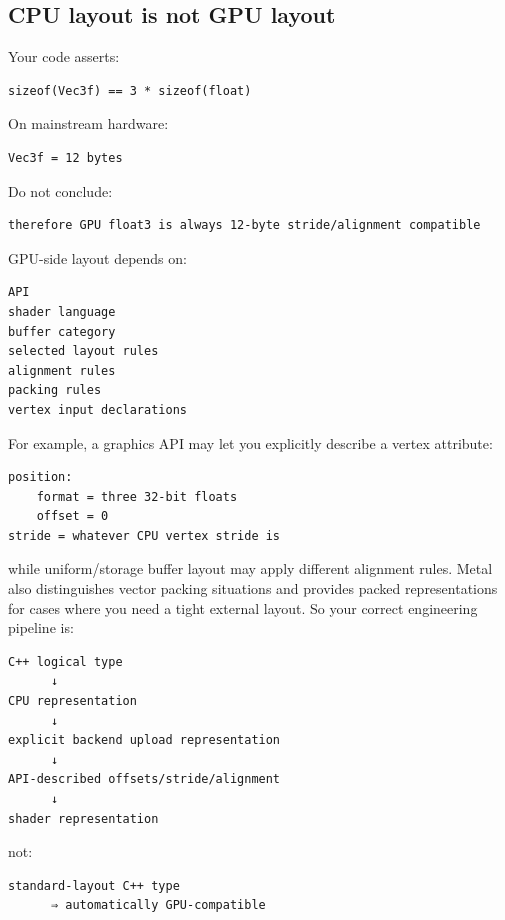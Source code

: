 \subsection{CPU layout is not GPU layout}\label{05-engine-i-ch003-cpu-layout-is-not-gpu-layout}

\hypertarget{05-engine-i-ch003-cpu-layout-is-not-gpu-layout}{}

Your code asserts:

\begin{verbatim}
sizeof(Vec3f) == 3 * sizeof(float)
\end{verbatim}

On mainstream hardware:

\begin{verbatim}
Vec3f = 12 bytes
\end{verbatim}

Do not conclude:

\begin{verbatim}
therefore GPU float3 is always 12-byte stride/alignment compatible
\end{verbatim}

GPU-side layout depends on:

\begin{verbatim}
API
shader language
buffer category
selected layout rules
alignment rules
packing rules
vertex input declarations
\end{verbatim}

For example, a graphics API may let you explicitly describe a vertex attribute:

\begin{verbatim}
position:
    format = three 32-bit floats
    offset = 0
stride = whatever CPU vertex stride is
\end{verbatim}

while uniform/storage buffer layout may apply different alignment rules. Metal also distinguishes vector packing situations and provides packed representations for cases where you need a tight external layout. So your correct engineering pipeline is:

\begin{verbatim}
C++ logical type
      ↓
CPU representation
      ↓
explicit backend upload representation
      ↓
API-described offsets/stride/alignment
      ↓
shader representation
\end{verbatim}

not:

\begin{verbatim}
standard-layout C++ type
      ⇒ automatically GPU-compatible
\end{verbatim}

